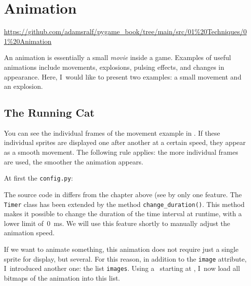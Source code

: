 \section{Animation}
\begin{diskbox}
	\url{https://github.com/adamsralf/pygame_book/tree/main/src/01%20Techniques/01%20Animation}
\end{diskbox}

An animation is essentially a small \emph{movie} inside a game. Examples of useful animations include movements, explosions, pulsing effects, and changes in appearance. Here, I~would like to present two examples: a small movement and an explosion.

\subsection{The Running Cat}


You can see the individual frames of the movement example in . If these individual sprites are displayed one after another at a certain speed, they appear as a smooth movement. The following rule applies: the more individual frames are used, the smoother the animation appears.

At first the \texttt{config.py}:


The source code in  differs from the chapter above (see  by only one feature. The \texttt{Timer} class has been extended by the method \texttt{change\_duration()}. This method makes it possible to change the duration of the time interval at runtime, with a lower limit of~\SI{0}{ms}. We will use this feature shortly to manually adjust the animation speed.


If we want to animate something, this animation does not require just a single sprite for display, but several. For this reason, in addition to the \texttt{image} attribute, I~introduced another one: the list \texttt{images}. Using a \forSchleife\ starting at , I~now load all bitmaps of the animation into this list.

